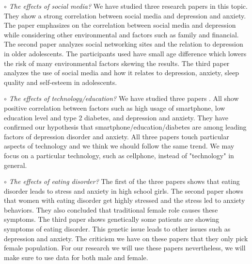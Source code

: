 \documentclass[letterpaper, 10 pt, conference]{ieeeconf}  %
\begin{document}
\par\noindent\textit{$\circ$ The effects of social media?}\newline
We have studied three research papers in this topic. They show a strong correlation between 
social media and depression and anxiety. The paper \cite{lin2016association} emphasizes on the correlation 
between social media and depression while considering other environmental and factors such as family and financial. 
The second paper \cite{jelenchick2013facebook} analyzes social networking sites and the relation to depression in older 
adolescents. The participants used have small age difference which lowers the risk of many 
environmental factors skewing the results. The third paper \cite{woods2016sleepyteens} analyzes the use of social media 
and how it relates to depression, anxiety, sleep quality and self-esteem in adolescents. 

\par\noindent\textit{$\circ$ The effects of technology/education?}\newline
We have studied three papers \cite{demirci2015relationship}\cite{bjelland2008does}\cite{mezuk2008influence}. All show positive correlation between 
factors such as high usage of smartphone, low education level and type 2 
diabetes, and depression and anxiety. They have confirmed our hypothesis 
that smartphone/education/diabetes are among leading factors of depression 
disorder and anxiety. All three papers touch particular aspects of technology and we think we should follow the same trend.
We may focus on a particular technology, such as cellphone, instead of "technology" in general. 

\par\noindent\textit{$\circ$ The effects of eating disorder?}\newline
The 
first of the three papers \cite{sassaroli2005role} shows that eating disorder leads to stress and anxiety in 
high school girls. The second paper \cite{martz1995relationship} shows that women with eating disorder 
get highly stressed and the stress led to anxiety behaviors. They also concluded that 
traditional female role causes these symptoms. The third paper \cite{striegel2007risk} shows genetically 
some patients are showing symptoms of eating disorder. This genetic issue leads 
to other issues such as depression and anxiety. The criticism we have on these papers that they only pick 
female population. For our research we will use 
these papers nevertheless, we will make sure to use data for both male and female.  
\end{document}
